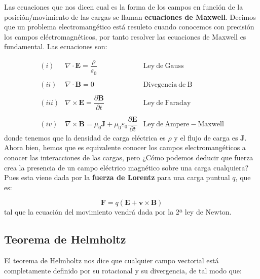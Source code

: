 \documentclass[12pt,a4paper]{article}
\newcommand{\rota}{\nabla \times}
\newcommand{\dive}{\nabla \cdot}
\newcommand{\Bn}{\mathbf{B}}
\newcommand{\En}{\mathbf{E}}
\newcommand{\Jn}{\mathbf{J}}
\newcommand{\Fn}{\mathbf{F}}
\newcommand{\vn}{\mathbf{v}}
\numberwithin{equation}{section}
\numberwithin{figure}{section}
\begin{document}
Las ecuaciones que nos dicen cual es la forma de los campos en función de la posición/movimiento de las cargas se llaman \textbf{ecuaciones de Maxwell}. Decimos que un problema electromangético está resuleto cuando conocemos con precisión los campos eléctromagnéticos, por tanto resolver las ecuaciones de Maxwell es fundamental. Las ecuaciones son:

\begin{equation}
\begin{array}{rll}
(i) & \dive \En = \dfrac{\rho}{\varepsilon_0}  & \mathrm{Ley \ de \ Gauss} \\ \\
(ii) & \dive \Bn = 0  & \mathrm{Divegencia \ de \ B} \\ \\
(iii) & \rota \En = \dfrac{\partial \Bn}{ \partial t}  & \mathrm{Ley \ de \ Faraday} \\ \\
(iv) & \rota \Bn = \mu_0 \Jn + \mu_0 \varepsilon_0 \dfrac{\partial \En}{\partial t} & \mathrm{Ley \ de \ Ampere-Maxwell} 
\end{array} \label{Ec:01.1.01}
\end{equation}
donde tenemos que la densidad de carga eléctrica es $\rho$ y el flujo de carga es $\Jn$. Ahora bien, hemos que es equivalente conocer los campos electromangéticos a conocer las interacciones de las cargas, pero ¿Cómo podemos deducir que fuerza crea la presencia de un campo eléctrico  magnético sobre una carga cualquiera? Pues esta viene dada por la \textbf{fuerza de Lorentz} para una carga puntual $q$, que es:

\begin{equation}
\Fn = q (\En + \vn \times \Bn) \label{Ec:01.1.02}
\end{equation}
tal que la ecuación del movimiento vendrá dada por la 2ª ley de Newton. 


\subsection{Teorema de Helmholtz}

El teorema de Helmholtz nos dice que cualquier campo vectorial está completamente definido por su rotacional y su divergencia, de tal modo que:
\end{document}
